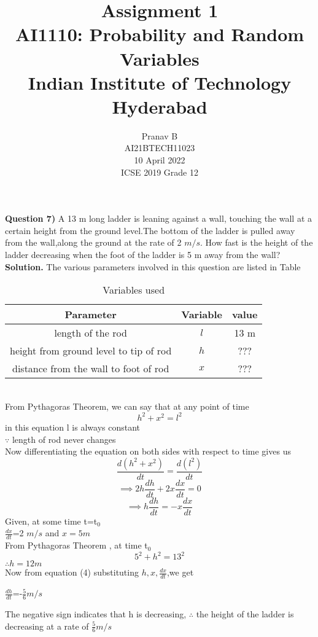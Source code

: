\documentclass[journal,12pt,twocolumn]{IEEEtran}
\title{Assignment 1 \\ \Large AI1110: Probability and Random Variables \\ \large Indian Institute of Technology Hyderabad}
\author{Pranav B \\ \normalsize AI21BTECH11023 \\ \vspace*{20pt} \normalsize  10 April 2022 \\ \vspace*{20pt} \Large ICSE 2019 Grade 12}
\begin{document}
	\maketitle
	
	\textbf{Question 7)} 
	A 13 m long ladder is leaning against a wall, touching the wall at a certain height from the ground level.The bottom of the ladder is pulled away from the wall,along the ground at the rate of 2 $m/s$. How fast is the height of the ladder decreasing when the foot of the ladder is 5 m away from the wall?\\
	\textbf{Solution.}
	The various parameters involved in this question are listed in Table \begin{table}[h]
\caption{Variables used}
\begin{tabular}{|c|c|c|}
\hline
Parameter & Variable & value\\
\hline
length of the rod & $l$ & 13 m\\
\hline
height from ground level to tip of rod & $h$ & ???\\
\hline
distance from the wall to foot of rod & $x$ &???\\
\hline
\end{tabular}
\end{table}
\\
From Pythagoras Theorem, we can say that at any point of time\\
\begin{equation}
h^2+x^2=l^2
\end{equation}
in this equation l is always constant\\
 $\because$ length of rod never changes\\
 Now differentiating the equation on both sides with respect to time gives us\\
 \begin{equation}
 \frac{d(h^2+x^2)}{dt}=\frac{d(l^2)}{dt}
 \end{equation}
 \begin{equation}
  \implies 2h\frac{dh}{dt}+2x\frac{dx}{dt}=0
 \end{equation}
 \begin{equation}
 \implies h\frac{dh}{dt}=-x\frac{dx}{dt}
 \end{equation}
 Given, at some time t=t$_0$\\
  $\frac{dx}{dt}$=2 $m/s$ and $x= 5 m$\\
  From Pythagoras Theorem , at time t$_0$
  \begin{equation}
  5^2+h^2=13^2
  \end{equation}
  $\therefore h= 12 m$\\
  Now from equation (4) substituting $h,x,\frac{dx}{dt}$,we get\\
  \begin{center}
   $\frac{dh}{dt}$=-$\frac{5}{6} m/s$
\end{center}  
The negative sign indicates that h is decreasing,
$\therefore$ the height of the ladder is decreasing at a rate of $\frac{5}{6} m/s$
\end{document}

